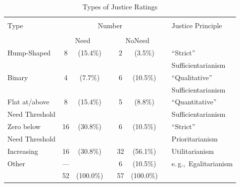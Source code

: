 \documentclass[12pt]{scrartcl}
\begin{document}
\begin{table}[ht!]
   \centering
   \caption{Types of Justice Ratings}\label{tab:individual}
   {\normalsize\small
   \begin{tabular}{lccccccl}\hline\\[-2.5ex]
   Type             & \multicolumn{5}{c}{Number}   &   & Justice Principle                                           \\\cline{2-6}\\[-2.5ex]
                    & \multicolumn{2}{c}{Need}     &   & \multicolumn{2}{c}{NoNeed}   &   &                          \\\hline\hline
   Hump-Shaped      &  8   &  (15.4\%)             &   &  2   &   (3.5\%)             &   & ``Strict''               \\
                    &      &                       &   &      &                       &   & Sufficientarianism       \\[1ex]
   Binary           &  4   &   (7.7\%)             &   &  6   &  (10.5\%)             &   & ``Qualitative''          \\
                    &      &                       &   &      &                       &   & Sufficientarianism       \\[1ex]
   Flat at/above    &  8   &  (15.4\%)             &   &  5   &   (8.8\%)             &   & ``Quantitative''         \\
   Need Threshold   &      &                       &   &      &                       &   & Sufficientarianism       \\[1ex]
   Zero below       & 16   &  (30.8\%)             &   &  6   &  (10.5\%)             &   & ``Strict''               \\
   Need Threshold   &      &                       &   &      &                       &   & Prioritarianism          \\[1ex]
   Increasing       & 16   &  (30.8\%)             &   & 32   &  (56.1\%)             &   & Utilitarianism           \\[1ex]
   Other            & ---  &                       &   &  6   &  (10.5\%)             &   & e.\,g.,~Egalitarianism   \\[0.5ex]\hline
                    & 52   & (100.0\%)             &   & 57   & (100.0\%)             &   &                          \\\hline
   \end{tabular}
   }
\end{table}
\end{document}
